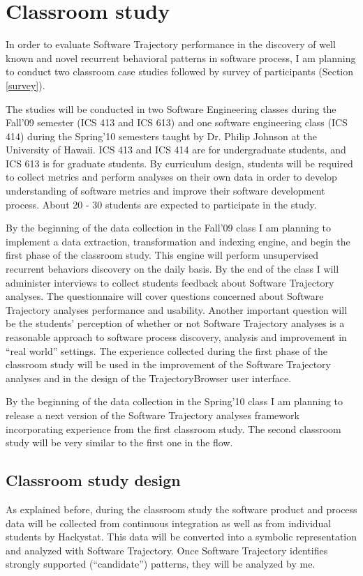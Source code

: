 \section{Classroom study}\label{classroom}
In order to evaluate Software Trajectory performance in the discovery of well known and novel recurrent behavioral patterns in software process, I am planning to conduct two classroom case studies followed by survey of participants (Section \ref{survey}). 

The studies will be conducted in two Software Engineering classes during the Fall'09 semester (ICS 413 and ICS 613) and one software engineering class (ICS 414) during the Spring'10 semesters taught by Dr. Philip Johnson at the University of Hawaii. ICS 413 and ICS 414 are for undergraduate students, and ICS 613 is for graduate students. By curriculum design, students will be required to collect metrics and perform analyses on their own data in order to develop understanding of software metrics and improve their software development process. About 20 - 30 students are expected to participate in the study. 

By the beginning of the data collection in the Fall'09 class I am planning to implement a data extraction, transformation and indexing engine, and begin the first phase of the classroom study. This engine will perform unsupervised recurrent behaviors discovery on the daily basis. By the end of the class I will administer interviews to collect students feedback about Software Trajectory analyses. The questionnaire will cover questions concerned about Software Trajectory analyses performance and usability. Another important question will be the students' perception of whether or not Software Trajectory analyses is a reasonable approach to software process discovery, analysis and improvement in ``real world'' settings. The experience collected during the first phase of the classroom study will be used in the improvement of the Software Trajectory analyses and in the design of the TrajectoryBrowser user interface.

By the beginning of the data collection in the Spring'10 class I am planning to release a next version of the Software Trajectory analyses framework incorporating experience from the first classroom study. The second classroom study will be very similar to the first one in the flow. 

\subsection{Classroom study design}
As explained before, during the classroom study the software product and process data will be collected from continuous integration as well as from individual students by Hackystat. This data will be converted into a symbolic representation and analyzed with Software Trajectory. Once Software Trajectory identifies strongly supported (``candidate'') patterns, they will be analyzed by me.


